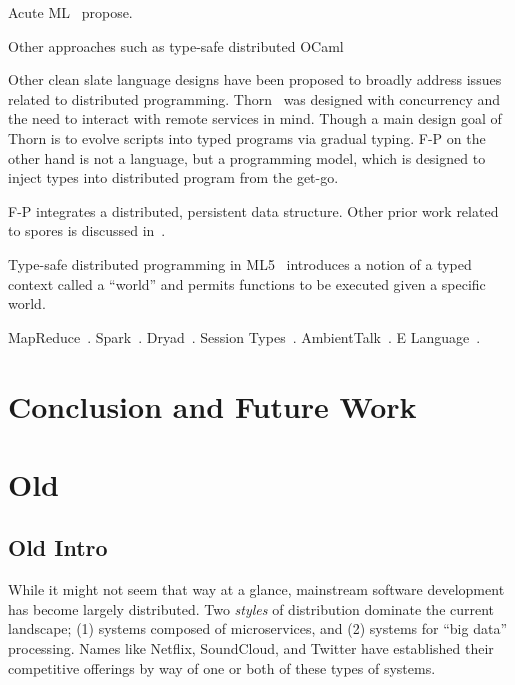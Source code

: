 \documentclass[preprint]{sigplanconf}
\theoremstyle{definition}
\theoremstyle{definition}
\begin{document}
Acute ML~\cite{AcuteML} propose.

Other approaches such as type-safe distributed OCaml~\cite{DistOCaml}

Other clean slate language designs have been proposed to broadly address
issues related to distributed programming. Thorn~\cite{Thorn} was designed
with concurrency and the need to interact with remote services in mind. Though
a main design goal of Thorn is to evolve scripts into typed programs via
gradual typing. F-P on the other hand is not a language, but a programming
model, which is designed to inject types into distributed program from the
get-go.

F-P integrates a distributed, persistent data structure. Other prior work
related to spores is discussed in~\cite{Spores}.

Type-safe distributed programming in ML5~\cite{Tom7} introduces a notion of a
typed context called a ``world'' and permits functions to be executed given a
specific world.

MapReduce~\cite{MapReduce}. Spark~\cite{Spark}. Dryad~\cite{Dryad}. Session
Types~\cite{SessionTypes}. AmbientTalk~\cite{AmbientTalk}. E
Language~\cite{ELang}.



\section{Conclusion and Future Work}
\label{sec:conclusion-future-work}

\section{Old}

\subsection{Old Intro}


While it might not seem that way at a glance, mainstream software development
has become largely distributed. Two {\em styles} of distribution
dominate the current landscape; (1) systems composed of microservices,
and (2) systems for ``big data'' processing. Names like Netflix, SoundCloud,
and Twitter have established their competitive offerings by way of one or
both of these types of systems.
\end{document}
